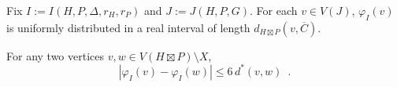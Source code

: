 \documentclass{patmorin}
\renewcommand{\ge}{\geqslant}
\renewcommand{\le}{\leqslant}
\begin{document}


\begin{obs}\label{uniform}
  Fix $I:=I(H,P,\Delta,r_H,r_P)$ and $J:=J(H,P,G)$.  For each $v\in V(J)$,
  $\varphi_I(v)$ is uniformly distributed in a real interval of length $d_{H\boxtimes P}(v,\overline{C})$.
\end{obs}




\begin{lem}\label{double_distance}
  For any two vertices $v,w\in V(H\boxtimes P)\setminus X$,
  \[
    |\varphi_I(v)-\varphi_I(w)| \le 6\, d^*(v,w) \enspace .
  \]
\end{lem}
\end{document}
